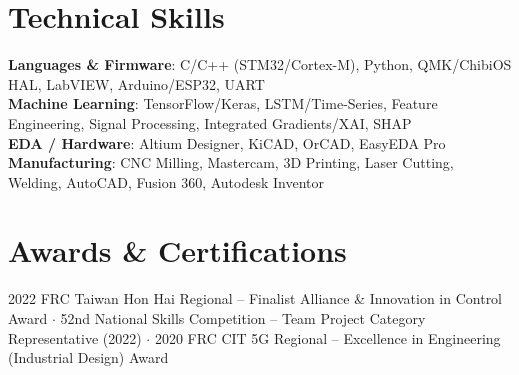 \documentclass[letterpaper,11pt]{article}
\begin{document}
\section{Technical Skills}
 \begin{itemize}[leftmargin=0.0in, label={}]
    \small{\item{
     \textbf{Languages \& Firmware}{: C/C++ (STM32/Cortex-M), Python, QMK/ChibiOS HAL, LabVIEW, Arduino/ESP32, UART} \\
     \textbf{Machine Learning}{: TensorFlow/Keras, LSTM/Time-Series, Feature Engineering, Signal Processing, Integrated Gradients/XAI, SHAP} \\
     \textbf{EDA / Hardware}{: Altium Designer, KiCAD, OrCAD, EasyEDA Pro} \\
     \textbf{Manufacturing}{: CNC Milling, Mastercam, 3D Printing, Laser Cutting, Welding, AutoCAD, Fusion 360, Autodesk Inventor} \\
    }}
 \end{itemize}

\section{Awards \& Certifications}
 \begin{itemize}[leftmargin=0.0in, label={}]
    \small{\item{
     2022 FRC Taiwan Hon Hai Regional -- Finalist Alliance \& Innovation in Control Award $\cdot$
     52nd National Skills Competition -- Team Project Category Representative (2022) $\cdot$
     2020 FRC CIT 5G Regional -- Excellence in Engineering (Industrial Design) Award
    }}
 \end{itemize}
\end{document}
